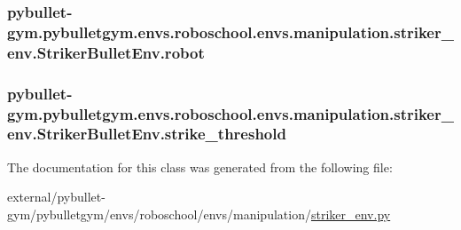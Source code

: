 \subsubsection[{\texorpdfstring{robot}{robot}}]{\setlength{\rightskip}{0pt plus 5cm}pybullet-\/gym.\+pybulletgym.\+envs.\+roboschool.\+envs.\+manipulation.\+striker\+\_\+env.\+Striker\+Bullet\+Env.\+robot}\hypertarget{classpybullet-gym_1_1pybulletgym_1_1envs_1_1roboschool_1_1envs_1_1manipulation_1_1striker__env_1_1_striker_bullet_env_ac2655349c64ed19b8d3c010120622367}{}\label{classpybullet-gym_1_1pybulletgym_1_1envs_1_1roboschool_1_1envs_1_1manipulation_1_1striker__env_1_1_striker_bullet_env_ac2655349c64ed19b8d3c010120622367}
\subsubsection[{\texorpdfstring{strike\+\_\+threshold}{strike_threshold}}]{\setlength{\rightskip}{0pt plus 5cm}pybullet-\/gym.\+pybulletgym.\+envs.\+roboschool.\+envs.\+manipulation.\+striker\+\_\+env.\+Striker\+Bullet\+Env.\+strike\+\_\+threshold}\hypertarget{classpybullet-gym_1_1pybulletgym_1_1envs_1_1roboschool_1_1envs_1_1manipulation_1_1striker__env_1_1_striker_bullet_env_a15feb48285175d48354c4bdf391651aa}{}\label{classpybullet-gym_1_1pybulletgym_1_1envs_1_1roboschool_1_1envs_1_1manipulation_1_1striker__env_1_1_striker_bullet_env_a15feb48285175d48354c4bdf391651aa}


The documentation for this class was generated from the following file\+:\begin{DoxyCompactItemize}
\item 
external/pybullet-\/gym/pybulletgym/envs/roboschool/envs/manipulation/\hyperlink{roboschool_2envs_2manipulation_2striker__env_8py}{striker\+\_\+env.\+py}\end{DoxyCompactItemize}
